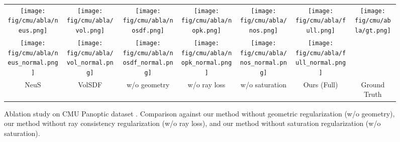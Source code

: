 \begin{figure*}[ht]
\centering%
\def\tabularxcolumn#1{m{#1}}
\setlength{\tabcolsep}{0pt}
\renewcommand{\arraystretch}{0} %
\begin{tabular}{ccccccc}
\texttt{[image: fig/cmu/abla/neus.png]} &
\texttt{[image: fig/cmu/abla/vol.png]} &
\texttt{[image: fig/cmu/abla/nosdf.png]} &
\texttt{[image: fig/cmu/abla/nopk.png]} &
\texttt{[image: fig/cmu/abla/nos.png]}&
\texttt{[image: fig/cmu/abla/full.png]} &
\texttt{[image: fig/cmu/abla/gt.png]}  \\ 
\texttt{[image: fig/cmu/abla/neus\_normal.png]} &
\texttt{[image: fig/cmu/abla/vol\_normal.png]} &
\texttt{[image: fig/cmu/abla/nosdf\_normal.png]} &
\texttt{[image: fig/cmu/abla/nopk\_normal.png]} &
\texttt{[image: fig/cmu/abla/nos\_normal.png]}&
\texttt{[image: fig/cmu/abla/full\_normal.png]} &\\
NeuS & VolSDF &w/o geometry  &w/o ray loss &w/o saturation  & Ours (Full) & Ground Truth\\
\end{tabular}
 \caption{Ablation study on CMU Panoptic dataset \cite{Simon_2017_CVPR,Joo_2017_TPAMI}. Comparison against our method without geometric regularization (w/o geometry), our method without ray consistency regularization (w/o ray loss), and our method without saturation regularization (w/o saturation).}
\label{fig:abl} 
\end{figure*}




